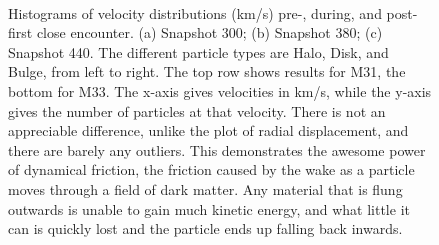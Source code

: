 \documentclass[linenumbers]{aastex631} %
\begin{document}
\begin{figure}[ht!]
\centering
      
      
   \\
      
\caption{\label{fig:vdists} Histograms of velocity distributions (km/s) pre-, during, and post- first close encounter. (a) Snapshot 300; (b) Snapshot 380; (c) Snapshot 440. The different particle types are Halo, Disk, and Bulge, from left to right. The top row shows results for M31, the bottom for M33. The x-axis gives velocities in km/s, while the y-axis gives the number of particles at that velocity. There is not an appreciable difference, unlike the plot of radial displacement, and there are barely any outliers. This demonstrates the awesome power of dynamical friction, the friction caused by the wake as a particle moves through a field of dark matter. Any material that is flung outwards is unable to gain much kinetic energy, and what little it can is quickly lost and the particle ends up falling back inwards.}
\end{figure}
\end{document}
